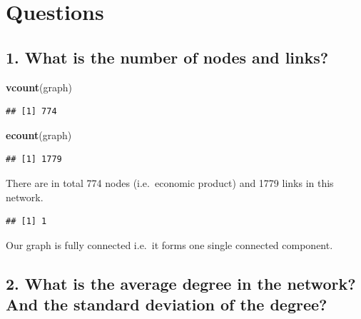 \documentclass[
]{article}
\newenvironment{Shaded}{\begin{snugshade}}{\end{snugshade}}
\newcommand{\FunctionTok}[1]{\textcolor[rgb]{0.13,0.29,0.53}{\textbf{#1}}}
\newcommand{\NormalTok}[1]{#1}
\newcommand{\OtherTok}[1]{\textcolor[rgb]{0.56,0.35,0.01}{#1}}
\newcommand{\SpecialCharTok}[1]{\textcolor[rgb]{0.81,0.36,0.00}{\textbf{#1}}}
\begin{document}
\section{Questions}\label{questions}

\subsection{1. What is the number of nodes and
links?}\label{what-is-the-number-of-nodes-and-links}

\begin{Shaded}
\begin{Highlighting}[]
\FunctionTok{vcount}\NormalTok{(graph)}
\end{Highlighting}
\end{Shaded}

\begin{verbatim}
## [1] 774
\end{verbatim}

\begin{Shaded}
\begin{Highlighting}[]
\FunctionTok{ecount}\NormalTok{(graph)}
\end{Highlighting}
\end{Shaded}

\begin{verbatim}
## [1] 1779
\end{verbatim}

There are in total 774 nodes (i.e.~economic product) and 1779 links in
this network.

\begin{Shaded}
\end{Shaded}

\begin{verbatim}
## [1] 1
\end{verbatim}

Our graph is fully connected i.e.~it forms one single connected
component.

\subsection{2. What is the average degree in the network? And the
standard deviation of the
degree?}\label{what-is-the-average-degree-in-the-network-and-the-standard-deviation-of-the-degree}
\end{document}
